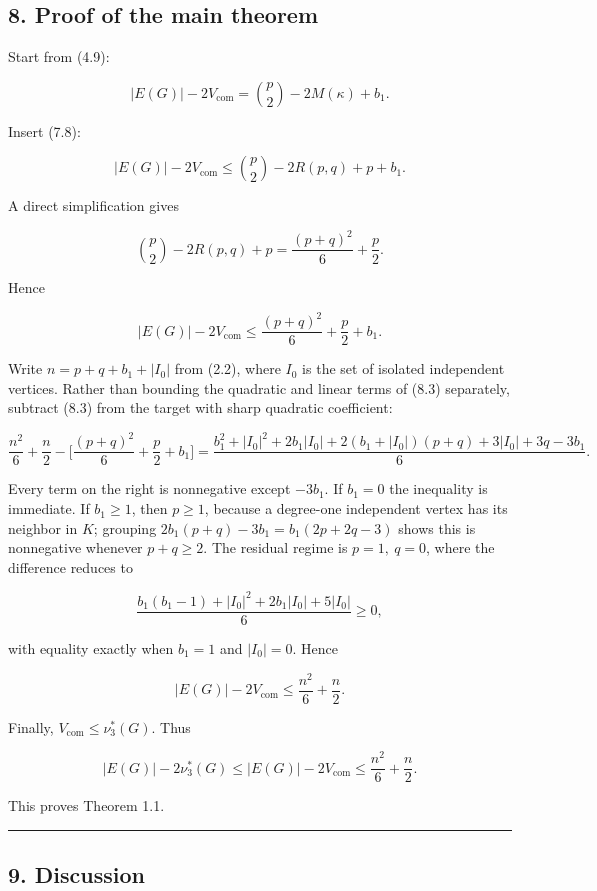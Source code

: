 \documentclass[english,11pt,a4paper]{article}
\begin{document}
\subsection{8. Proof of the main
theorem}\label{proof-of-the-main-theorem}

Start from (4.9):

\[
|E(G)|-2V_{\mathrm{com}}
=
\binom p2-2M(\kappa)+b_1.
\]

Insert (7.8):

\[
|E(G)|-2V_{\mathrm{com}}
\le
\binom p2-2R(p,q)+p+b_1.
\tag{8.1}
\]

A direct simplification gives

\[
\binom p2-2R(p,q)+p
=
\frac{(p+q)^2}{6}+\frac p2.
\tag{8.2}
\]

Hence

\[
|E(G)|-2V_{\mathrm{com}}
\le
\frac{(p+q)^2}{6}+\frac p2+b_1.
\tag{8.3}
\]

Write \(n=p+q+b_1+|I_0|\) from (2.2), where \(I_0\) is the set of
isolated independent vertices. Rather than bounding the quadratic and
linear terms of (8.3) separately, subtract (8.3) from the target with
sharp quadratic coefficient:

\[
\frac{n^2}{6}+\frac n2-\Big[\frac{(p+q)^2}{6}+\frac p2+b_1\Big]
=
\frac{b_1^2+|I_0|^2+2b_1|I_0|+2(b_1+|I_0|)(p+q)+3|I_0|+3q-3b_1}{6}.
\]

Every term on the right is nonnegative except \(-3b_1\). If \(b_1=0\)
the inequality is immediate. If \(b_1\ge1\), then \(p\ge1\), because a
degree-one independent vertex has its neighbor in \(K\); grouping
\(2b_1(p+q)-3b_1=b_1(2p+2q-3)\) shows this is nonnegative whenever
\(p+q\ge2\). The residual regime is \(p=1,\ q=0\), where the difference
reduces to

\[
\frac{b_1(b_1-1)+|I_0|^2+2b_1|I_0|+5|I_0|}{6}\ge0,
\]

with equality exactly when \(b_1=1\) and \(|I_0|=0\). Hence

\[
|E(G)|-2V_{\mathrm{com}}
\le
\frac{n^2}{6}+\frac n2.
\tag{8.4}
\]

Finally, \(V_{\mathrm{com}}\le\nu_3^*(G)\). Thus

\[
|E(G)|-2\nu_3^*(G)
\le
|E(G)|-2V_{\mathrm{com}}
\le
\frac{n^2}{6}+\frac n2.
\]

This proves Theorem 1.1.

\begin{center}\rule{0.5\linewidth}{0.5pt}\end{center}

\subsection{9. Discussion}\label{discussion}
\end{document}
